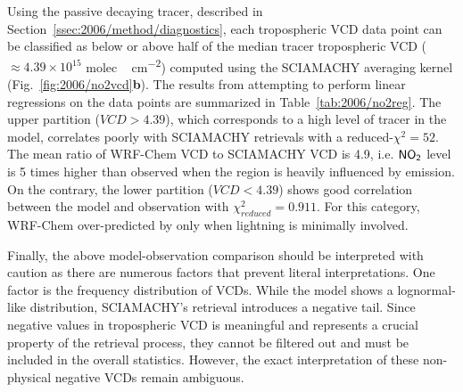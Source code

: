 Using the passive decaying {\lnox} tracer, described in Section~\ref{ssec:2006/method/diagnostics}, each tropospheric VCD
data point can be classified as below or above half of the median {\lnox} tracer tropospheric VCD ($\approx4.39\times10^{15}$
\unit{molec.\,cm^{-2}}) computed using the SCIAMACHY averaging kernel (Fig.~\ref{fig:2006/no2vcd}{\bf b}). The results from
attempting to perform linear regressions on the data points are summarized in Table~\ref{tab:2006/no2reg}. The upper partition
($VCD>4.39$), which corresponds to a high level of {\lnox} tracer in the model, correlates poorly with SCIAMACHY retrievals with
a reduced-$\chi^2=52$. The mean ratio of WRF-Chem VCD to SCIAMACHY VCD is 4.9, i.e. $\chem{NO_2}$ level is 5 times higher
than observed when the region is heavily influenced by {\lnox} emission. On the contrary, the lower partition ($VCD<4.39$) shows
good correlation between the model and observation with $\chi_{reduced}^2=0.911$. For this category, WRF-Chem over-predicted
 by only  when lightning is minimally involved.

Finally, the above model-observation comparison should be interpreted with caution as there are numerous factors that prevent literal
interpretations. One factor is the frequency distribution of VCDs. While the model shows a lognormal-like distribution,
SCIAMACHY's retrieval introduces a negative tail. Since negative values in tropospheric VCD is meaningful and represents a crucial
property of the retrieval process, they cannot be filtered out and must be included in the overall statistics. However, the exact
interpretation of these non-physical negative VCDs remain ambiguous.


\vspace{1.2in}

